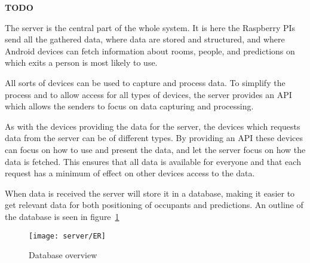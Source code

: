 {\color[rgb]{1,0,0} \textbf{\large TODO}}

The server is the central part of the whole system. It is here the Raspberry PIs send all the gathered data, where data are stored and structured, and where Android devices can fetch information about rooms, people, and predictions on which exits a person is most likely to use.

All sorts of devices can be used to capture and process data. To simplify the process and to allow access for all types of devices, the server provides an API which allows the senders to focus on data capturing and processing.

As with the devices providing the data for the server, the devices which requests data from the server can be of different types. By providing an API these devices can focus on how to use and present the data, and let the server focus on how the data is fetched. This ensures that all data is available for everyone and that each request has a minimum of effect on other devices access to the data.

When data is received the server will store it in a database, making it easier to get relevant data for both positioning of occupants and predictions. An outline of the database is seen in figure~\ref{fig:database_er_diagram} 

\begin{figure}[ht]
	\centering
	\texttt{[image: server/ER]}
	\caption{Database overview}
	\label{fig:database_er_diagram}
\end{figure}